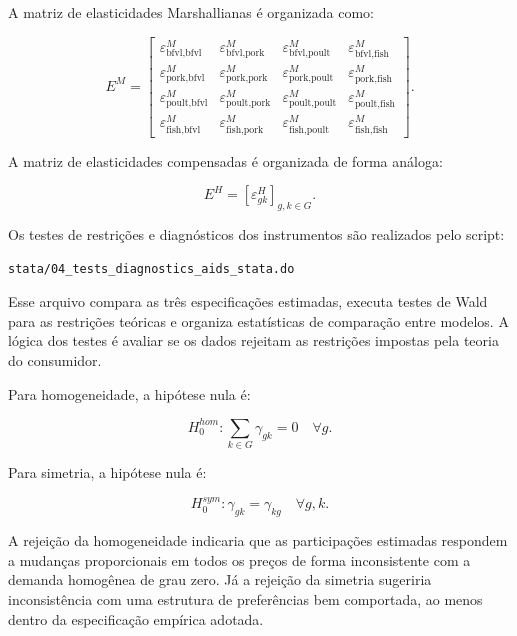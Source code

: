 \documentclass[12pt,a4paper]{article}
\begin{document}
A matriz de elasticidades Marshallianas é organizada como:

\[
E^M
=
\begin{bmatrix}
\varepsilon^M_{\text{bfvl},\text{bfvl}} &
\varepsilon^M_{\text{bfvl},\text{pork}} &
\varepsilon^M_{\text{bfvl},\text{poult}} &
\varepsilon^M_{\text{bfvl},\text{fish}} \\

\varepsilon^M_{\text{pork},\text{bfvl}} &
\varepsilon^M_{\text{pork},\text{pork}} &
\varepsilon^M_{\text{pork},\text{poult}} &
\varepsilon^M_{\text{pork},\text{fish}} \\

\varepsilon^M_{\text{poult},\text{bfvl}} &
\varepsilon^M_{\text{poult},\text{pork}} &
\varepsilon^M_{\text{poult},\text{poult}} &
\varepsilon^M_{\text{poult},\text{fish}} \\

\varepsilon^M_{\text{fish},\text{bfvl}} &
\varepsilon^M_{\text{fish},\text{pork}} &
\varepsilon^M_{\text{fish},\text{poult}} &
\varepsilon^M_{\text{fish},\text{fish}}
\end{bmatrix}.
\tag{45}
\label{eq:matriz_marshalliana}
\]

A matriz de elasticidades compensadas é organizada de forma análoga:

\[
E^H
=
\left[
\varepsilon^H_{gk}
\right]_{g,k \in G}.
\tag{46}
\label{eq:matriz_hicksiana}
\]

Os testes de restrições e diagnósticos dos instrumentos são realizados pelo script:

\begin{verbatim}
stata/04_tests_diagnostics_aids_stata.do
\end{verbatim}

Esse arquivo compara as três especificações estimadas, executa testes de Wald para as restrições teóricas e organiza estatísticas de comparação entre modelos. A lógica dos testes é avaliar se os dados rejeitam as restrições impostas pela teoria do consumidor.

Para homogeneidade, a hipótese nula é:

\[
H_0^{hom}:
\sum_{k \in G}
\gamma_{gk}
=
0
\quad
\forall g.
\tag{47}
\label{eq:h0_homogeneidade}
\]

Para simetria, a hipótese nula é:

\[
H_0^{sym}:
\gamma_{gk}
=
\gamma_{kg}
\quad
\forall g,k.
\tag{48}
\label{eq:h0_simetria}
\]

A rejeição da homogeneidade indicaria que as participações estimadas respondem a mudanças proporcionais em todos os preços de forma inconsistente com a demanda homogênea de grau zero. Já a rejeição da simetria sugeriria inconsistência com uma estrutura de preferências bem comportada, ao menos dentro da especificação empírica adotada.
\end{document}
